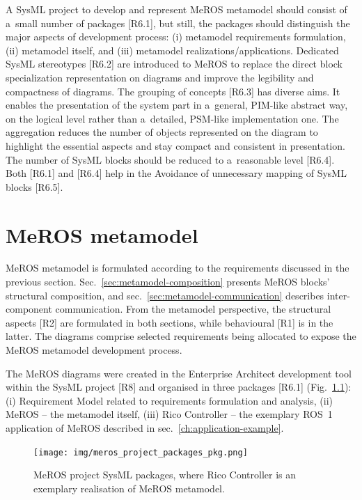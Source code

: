 \documentclass[11pt,oneside,a4paper]{report}
\begin{document}
	A SysML project to develop and represent MeROS metamodel should consist of a~small number of packages [R6.1], but still, the packages should distinguish the major aspects of development process: (i) metamodel requirements formulation, (ii) metamodel itself, and (iii) metamodel realizations/applications.
	Dedicated SysML stereotypes [R6.2] are introduced to MeROS to replace the direct block specialization representation on diagrams and improve the legibility and compactness of diagrams.
	The grouping of concepts [R6.3] has diverse aims. It enables the presentation of the system part in a~general, PIM-like abstract way, on the logical level rather than a~detailed, PSM-like implementation one. The aggregation reduces the number of objects represented on the diagram to highlight the essential aspects and stay compact and consistent in presentation.
	The number of SysML blocks should be reduced to a~reasonable level [R6.4]. Both [R6.1] and [R6.4] help in the Avoidance of unnecessary mapping of SysML blocks [R6.5].

	
	
\chapter{MeROS metamodel}
\label{ch:metamodel}
	
	MeROS metamodel is formulated according to the requirements discussed in the previous section. Sec.~\ref{sec:metamodel-composition} presents MeROS blocks' structural composition, and sec.~\ref{sec:metamodel-communication} describes inter-component communication. From the metamodel perspective, the structural aspects [R2] are formulated in both sections, while behavioural [R1] is in the latter. The diagrams comprise selected requirements being allocated to expose the MeROS metamodel development process. 
	
	The MeROS diagrams were created in the Enterprise Architect development tool within the SysML project [R8] and organised in three packages [R6.1] (Fig.~\ref{fig:meros_project_packages_pkg}): (i) Requirement Model related to requirements formulation and analysis, (ii) MeROS -- the metamodel itself, (iii) Rico Controller -- the exemplary ROS~1 application of MeROS described in sec.~\ref{ch:application-example}. 
	
		
	\begin{figure}[H]
		\centering
		\begin{center}
			{\texttt{[image: img/meros\_project\_packages\_pkg.png]}}
		\end{center}
		\caption{MeROS project SysML packages, where Rico Controller is an exemplary realisation of MeROS metamodel.} 
		\label{fig:meros_project_packages_pkg}
	\end{figure}
	
\end{document}
